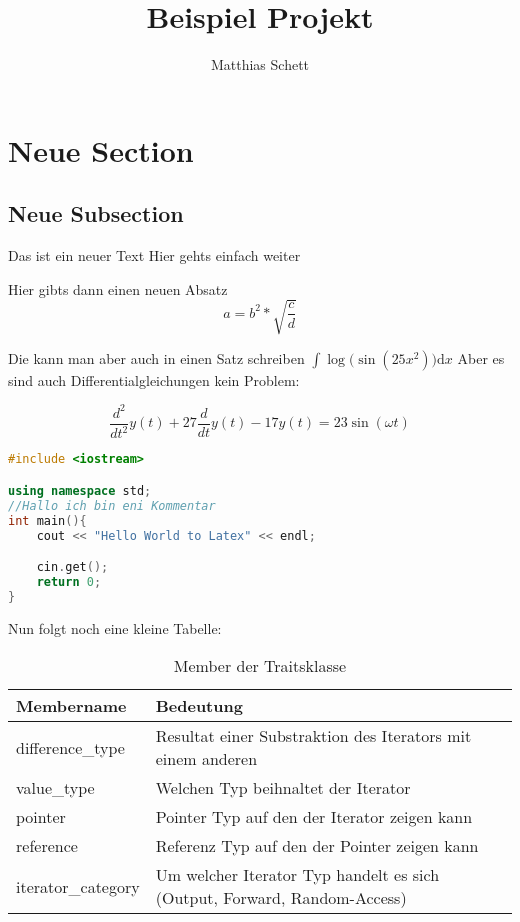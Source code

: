 \documentclass[a4paper, parskip = half]{scrartcl} %
\title{Beispiel Projekt} %
\author{Matthias Schett}
\date{}
\begin{document}

\maketitle  %
\tableofcontents %

\newpage %
\section{Neue Section} %
\subsection{Neue Subsection} %

Das ist ein neuer Text
Hier gehts einfach weiter

Hier gibts dann einen neuen Absatz
\[ a = b^2 * \sqrt{\frac{c}{d}} \] %

Die kann man aber auch in einen Satz schreiben $ \int{\log{(\sin{(25x^2))}} \mathrm{d}x} $ 
Aber es sind auch Differentialgleichungen kein Problem:

\[ \frac{d^2}{dt^2}y(t) + 27 \frac{d}{dt} y(t) - 17 y(t) = 23 \sin{(\omega t)} \]

\begin{lstlisting}[language=C++]
#include <iostream>

using namespace std;
//Hallo ich bin eni Kommentar
int main(){
	cout << "Hello World to Latex" << endl;

	cin.get();
	return 0;
}
\end{lstlisting}

Nun folgt noch eine kleine Tabelle:
\begin{table}[htb]
	\centering
    \begin{tabular}{ | l | p{7cm} | }
        \hline
        Membername & Bedeutung \\ \hline \hline
        difference\_type & Resultat einer Substraktion des Iterators mit einem anderen \\ \hline
        value\_type & Welchen Typ beihnaltet der Iterator \\ \hline
        pointer & Pointer Typ auf den der Iterator zeigen kann \\ \hline
        reference & Referenz Typ auf den der Pointer zeigen kann \\ \hline
        iterator\_category & Um welcher Iterator Typ handelt es sich (Output, Forward, Random-Access) \\ \hline
    \end{tabular}
    \caption{Member der Traitsklasse}\label{table:traitsMember}
\end{table}
\end{document}
